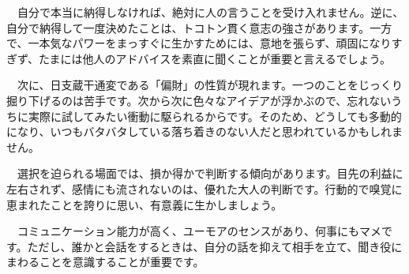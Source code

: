 \documentclass[a5paper,11pt,dvipdfmx]{tarticle}
\begin{document}
\begin{enumerate}
  　自分で本当に納得しなければ、絶対に人の言うことを受け入れません。逆に、自分で納得して一度決めたことは、トコトン貫く意志の強さがあります。一方で、一本気なパワーをまっすぐに生かすためには、意地を張らず、頑固になりすぎず、たまには他人のアドバイスを素直に聞くことが重要と言えるでしょう。
  
  　次に、日支蔵干通変である「偏財」の性質が現れます。一つのことをじっくり掘り下げるのは苦手です。次から次に色々なアイデアが浮かぶので、忘れないうちに実際に試してみたい衝動に駆られるからです。そのため、どうしても多動的になり、いつもバタバタしている落ち着きのない人だと思われているかもしれません。
  
  　選択を迫られる場面では、損か得かで判断する傾向があります。目先の利益に左右されず、感情にも流されないのは、優れた大人の判断です。行動的で嗅覚に恵まれたことを誇りに思い、有意義に生かしましょう。
  
　コミュニケーション能力が高く、ユーモアのセンスがあり、何事にもマメです。ただし、誰かと会話をするときは、自分の話を抑えて相手を立て、聞き役にまわることを意識することが重要です。

\end{enumerate}
\end{document}
